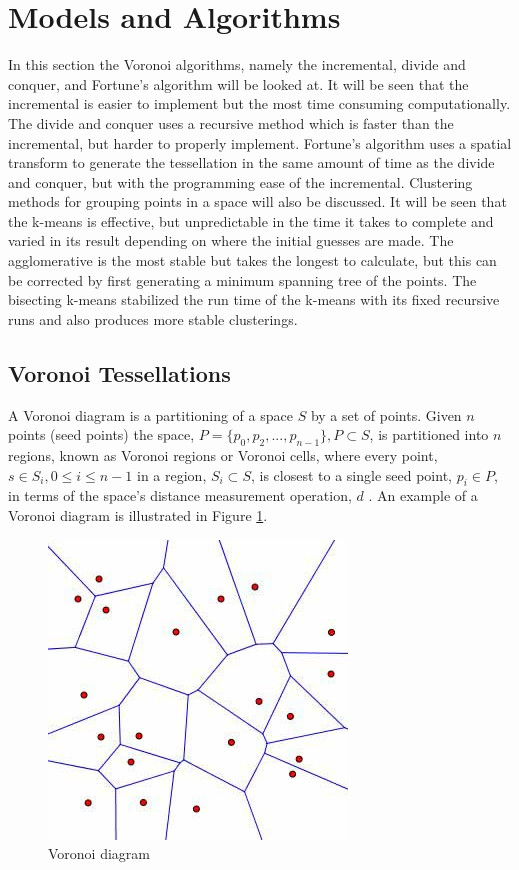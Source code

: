 \section{Models and Algorithms}\label{tes}
In this section the Voronoi algorithms, namely the incremental, divide and conquer, and Fortune's algorithm will be looked at. It will be seen that the incremental is easier to implement but the most time consuming computationally. The divide and conquer uses a recursive method which is faster than the incremental, but harder to properly implement. Fortune's algorithm uses a spatial transform to generate the tessellation in the same amount of time as the divide and conquer, but with the programming ease of the incremental. Clustering methods for grouping points in a space will also be discussed. It will be seen that the k-means is effective, but unpredictable in the time it takes to complete and varied in its result depending on where the initial guesses are made. The agglomerative is the most stable but takes the longest to calculate, but this can be corrected by first generating a minimum spanning tree of the points. The bisecting k-means stabilized the run time of the k-means with its fixed recursive runs and also produces more stable clusterings.
\subsection{Voronoi Tessellations}\label{tes:sec:vor}
A Voronoi diagram is a partitioning of a space $S$ by a set of points. Given $n$ points (seed points) the space, $P = \{p_0,p_2,...,p_{n-1}\}, P \subset S$, is partitioned into $n$ regions, known as Voronoi regions or Voronoi cells, where every point, $s \in S_i,0 \leq i \leq n-1$ in a region, $S_i \subset S$, is closest to a single seed point, $p_i \in P$, in terms of the space's distance measurement operation, $d$ \citep{okabe2009spatial}. An example of a Voronoi diagram is illustrated in Figure \ref{tes:fig:voreg}.
%
\begin{figure}[H]
    \centering
    \includegraphics[scale=0.65]{Images/voronoi.jpg}
    \caption[]{Voronoi diagram\footnotemark}
    \label{tes:fig:voreg}
\end{figure}
%
